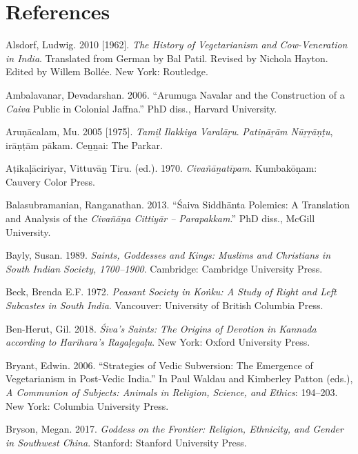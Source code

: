       
\section*{References}
\begin{hangparas}{0.125in}{1}

	
	\label{Alsdorf2010}Alsdorf, Ludwig. 2010 [1962]. \emph{The History of Vegetarianism and Cow-Veneration in India}. Translated from German by Bal Patil. Revised by Nichola Hayton. Edited by Willem Bollée. New York: Routledge. \medskip


	\label{Ambalavanar2006}Ambalavanar, Devadarshan. 2006. “Arumuga Navalar and the Construction of a \emph{Caiva} Public in Colonial Jaffna.” PhD diss., Harvard University.\medskip


	\label{Arunacalam2005}Aruṇācalam, Mu. 2005 [1975]. \emph{{Tamiḻ Ilakkiya Varalāṟu}}. \emph{{Patiṉāṟām Nūṟṟāṇṭu}}, {irāṇṭām pākam}. Ceṉṉai: The Parkar.\medskip


	\label{Atikalaciriyar1970}Aṭikaḷāciriyar, Vittuvāṉ Tiru. (ed.). 1970. \emph{{Civañāṉatīpam}}. Kumbakōṇam: Cauvery Color Press. \medskip


	\label{Balasubramanian2013}Balasubramanian, Ranganathan. 2013. “Śaiva Siddhānta Polemics: A Translation and Analysis of the \emph{{Civañāṉa Cittiyār – Parapakkam}}.” PhD diss., McGill University.\medskip


	\label{Bayly1989}Bayly, Susan. 1989. \emph{Saints, Goddesses and Kings: Muslims and Christians in South Indian Society, 1700–1900}. Cambridge: Cambridge University Press.\medskip


	\label{Beck1972}Beck, Brenda E.F. 1972. \emph{Peasant Society in Koṅku: A Study of Right and Left Subcastes in South India}. Vancouver: University of British Columbia Press.\medskip


	\label{BenHerut2018}Ben-Herut, Gil. 2018. \emph{Śiva’s Saints: The Origins of Devotion in Kannada according to Harihara’s Ragaḷegaḷu}. New York: Oxford University Press. \medskip


	\label{Bryan2006}Bryant, Edwin. 2006. “Strategies of Vedic Subversion: The Emergence of Vegetarianism in Post-Vedic India.” In Paul Waldau and Kimberley Patton (eds.), \emph{A Communion of Subjects: Animals in Religion, Science, and Ethics}: 194–203. New York: Columbia University Press.\medskip


	\label{Bryson2017}Bryson, Megan. 2017. \emph{Goddess on the Frontier: Religion, Ethnicity, and Gender in Southwest China}. Stanford: Stanford University Press.\medskip



\end{hangparas}

